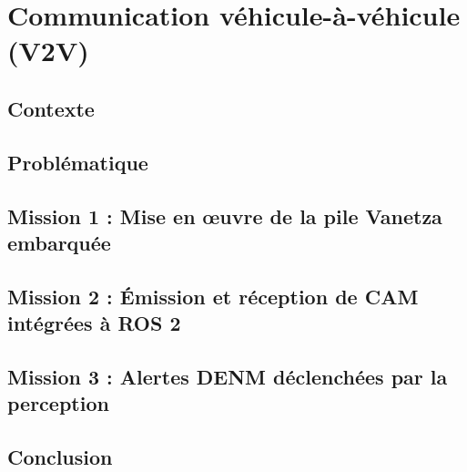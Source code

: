 \chapter{Communication véhicule-à-véhicule (V2V)}
\chapminitoc
\label{chap:v2v}

\section{Contexte}

\section{Problématique}

\section{Mission 1 : Mise en \oe uvre de la pile Vanetza embarquée}
\objectif
\methodes
\resultats
\discussion

\section{Mission 2 : Émission et réception de CAM intégrées à ROS 2}
\objectif
\methodes
\resultats
\discussion

\section{Mission 3 : Alertes DENM déclenchées par la perception}
\objectif
\methodes
\resultats
\discussion

\section{Conclusion}
